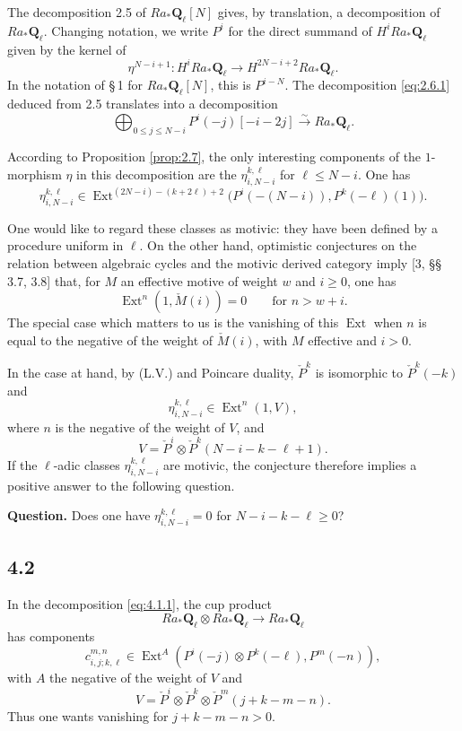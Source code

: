 \documentclass[11pt,a4paper]{article}
\theoremstyle{plain}
\theoremstyle{definition}
\theoremstyle{remark}
\DeclareMathOperator{\Ext}{Ext}
\newcommand{\bQ}{\mathbf{Q}}
\begin{document}
The decomposition 2.5 of $Ra_*\bQ_\ell[N]$ gives, by translation, a decomposition of $Ra_*\bQ_\ell$. Changing notation, we write $P^i$ for the direct summand of $H^iRa_*\bQ_\ell$ given by the kernel of
\[
\eta^{N-i+1}\colon H^iRa_*\bQ_\ell\to H^{2N-i+2}Ra_*\bQ_\ell.
\]
In the notation of \S\,1 for $Ra_*\bQ_\ell[N]$, this is $P^{i-N}$. The decomposition \eqref{eq:2.6.1} deduced from 2.5 translates into a decomposition
\begin{equation}\label{eq:4.1.1}
\bigoplus_{0\leqslant j\leqslant N-i}P^i(-j)[-i-2j]\xrightarrow{\sim}Ra_*\bQ_\ell.
\end{equation}

According to Proposition \ref{prop:2.7}, the only interesting components of the $1$-morphism $\eta$ in this decomposition are the $\eta^{k,\ell}_{i,N-i}$ for $\ell\leqslant N-i$. One has
\[
\eta^{k,\ell}_{i,N-i}\in\Ext^{(2N-i)-(k+2\ell)+2}\bigl(P^i(-(N-i)),P^k(-\ell)(1)\bigr).
\]

One would like to regard these classes as motivic: they have been defined by a procedure uniform in $\ell$. On the other hand, optimistic conjectures on the relation between algebraic cycles and the motivic derived category imply [3, \S\S\,3.7, 3.8] that, for $M$ an effective motive of weight $w$ and $i\geqslant0$, one has
\[
\Ext^n(1,\check M(i))=0\qquad\text{for }n>w+i.
\]
The special case which matters to us is the vanishing of this $\Ext$ when $n$ is equal to the negative of the weight of $\check M(i)$, with $M$ effective and $i>0$.

In the case at hand, by (L.V.) and Poincare duality, $\check P^k$ is isomorphic to $\check P^k(-k)$ and
\[
\eta^{k,\ell}_{i,N-i}\in\Ext^n(1,V),
\]
where $n$ is the negative of the weight of $V$, and
\[
V=\check P^i\otimes\check P^k(N-i-k-\ell+1).
\]
If the $\ell$-adic classes $\eta^{k,\ell}_{i,N-i}$ are motivic, the conjecture therefore implies a positive answer to the following question.

\smallskip
\noindent\textbf{Question.} Does one have $\eta^{k,\ell}_{i,N-i}=0$ for $N-i-k-\ell\geqslant0$?
\smallskip

\subsection*{4.2}
In the decomposition \eqref{eq:4.1.1}, the cup product
\[
Ra_*\bQ_\ell\otimes Ra_*\bQ_\ell\to Ra_*\bQ_\ell
\]
has components
\[
c^{m,n}_{i,j;k,\ell}\in\Ext^A(P^i(-j)\otimes P^k(-\ell),P^m(-n)),
\]
with $A$ the negative of the weight of $V$ and
\[
V=\check P^i\otimes\check P^k\otimes\check P^m(j+k-m-n).
\]
Thus one wants vanishing for $j+k-m-n>0$.
\end{document}
